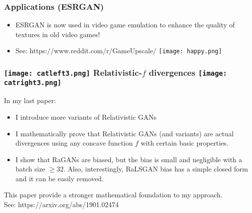 \documentclass[t]{beamer}
\begin{document}

\begin{frame}
\frametitle{Applications (ESRGAN)}
	\begin{itemize}
	\item ESRGAN is now used in video game emulation to enhance the quality of textures in old video games!
	\item See: https://www.reddit.com/r/GameUpscale/
	\texttt{[image: happy.png]}
\end{itemize}
\begin{figure}
	\centering
	\qquad
\end{figure}
\end{frame}


\begin{frame}
	\frametitle{\texttt{[image: catleft3.png]} Relativistic-$f$ divergences \texttt{[image: catright3.png]}}
	In my last paper:
	\begin{itemize}
		\item I introduce more variants of Relativistic GANs
		\item I mathematically prove that Relativistic GANs (and variants) are actual divergences using any concave function $f$ with certain basic properties.
		\item I show that RaGANs are biased, but the bias is small and negligible with a batch size $\geq 32$. Also, interestingly, RaLSGAN bias has a simple closed form and it can be easily removed.
	\end{itemize}
	
	This paper provide a stronger mathematical foundation to my approach. \\
	
	See: https://arxiv.org/abs/1901.02474
\end{frame}


\end{document}
